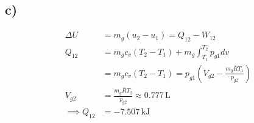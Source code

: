 

\subsection*{c)}
\begin{align*}
\Delta U &= m_g (u_2 - u_1) = Q_{12} - W_{12} \\
Q_{12} &= m_g c_v (T_2 - T_1) + m_g \int_{T_1}^{T_2} p_{g1} dv \\
&= m_g c_v (T_2 - T_1) = p_{g1} \left( V_{g2} - \frac{m_g \bar{R} T_1}{p_{g2}} \right) \\
V_{g2} &= \frac{m_g \bar{R} T_2}{p_{g2}} \approx 0.777 \, \text{L} \\
\implies Q_{12} &= -7.507 \, \text{kJ}
\end{align*}